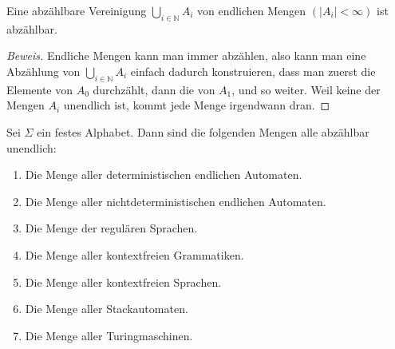 \begin{satz}\label{countablefinite}
Eine abzählbare Vereinigung $\bigcup_{i\in\mathbb N}A_i$ von endlichen
Mengen $(|A_i|<\infty)$ ist abzählbar.
\end{satz}

\begin{proof}[Beweis]
Endliche Mengen kann man immer abzählen, also kann man eine Abzählung
von $\bigcup_{i\in\mathbb N}A_i$ einfach dadurch konstruieren, dass
man zuerst die Elemente von $A_0$ durchzählt, dann die von $A_1$, und
so weiter. Weil keine der Mengen $A_i$ unendlich ist, kommt jede
Menge irgendwann dran.
\end{proof}

\begin{satz} Sei $\Sigma$ ein festes Alphabet. Dann sind die folgenden
Mengen alle abzählbar unendlich:
\begin{enumerate}
\item Die Menge aller deterministischen endlichen Automaten.
\item Die Menge aller nichtdeterministischen endlichen Automaten.
\item Die Menge der regulären Sprachen.
\item Die Menge aller kontextfreien Grammatiken.
\item Die Menge aller kontextfreien Sprachen.
\item Die Menge aller Stackautomaten.
\item Die Menge aller Turingmaschinen.
\end{enumerate}
\end{satz}

